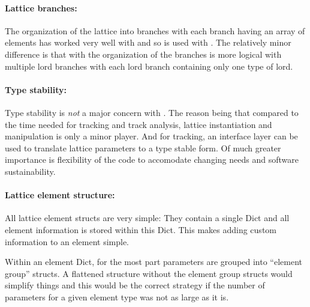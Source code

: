 \paragraph{Lattice branches:}
The organization of the lattice into branches with each branch having an array of elements has
worked very well with \bmad and so is used with \accellat. The relatively minor difference is
that with \accellat the organization of the branches is more logical with multiple lord branches
with each lord branch containing only one type of lord.

\paragraph{Type stability:}
Type stability is {\em not} a major concern with \accellat. The reason being that compared to
the time needed for tracking and track analysis, lattice instantiation
and manipulation is only a minor player. And for tracking, an interface layer can be
used to translate lattice parameters to a type stable form. Of much greater importance is
flexibility of the code to accomodate changing needs and software sustainability.

\paragraph{Lattice element structure:}
All lattice element structs are very simple: They contain a single Dict and all element information
is stored within this Dict. This makes adding custom information to an element simple. 

Within an element Dict, for the most part parameters are grouped into ``element group'' structs. A flattened structure
without the element group structs would simplify things and this would be the correct strategy
if the number of parameters for a given element type was not as large as it is. 
